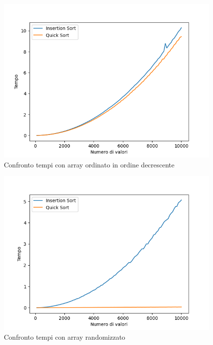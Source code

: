 \documentclass[
]{article}
\begin{document}
\begin{figure}[h!]
    \centering
    \includegraphics{../img/ord_rev/ord_rev_comparison10000.png}
    \caption{Confronto tempi con array ordinato in ordine decrescente}
\end{figure}

\newpage

\begin{figure}[h!]
    \centering
    \includegraphics{../img/rand/rand_comparison10000.png}
    \caption{Confronto tempi con array randomizzato}
    \label{fig:3}
\end{figure}
\newpage



\
\
\
\end{document}
